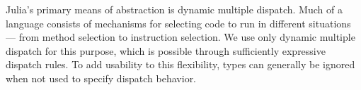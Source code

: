 \documentclass[9pt]{sigplanconf}
\newcommand{\Matlab}{MATLAB\textsuperscript{\tiny\textregistered}}
\begin{document}




Julia's primary means of abstraction is dynamic multiple dispatch.
Much of a language consists of mechanisms for selecting
code to run in different situations --- from method selection to
instruction selection. We use only dynamic multiple dispatch for this
purpose, which is possible through sufficiently expressive
dispatch rules. To add usability to this flexibility,
types can generally be ignored when not used to specify dispatch behavior.
\end{document}
